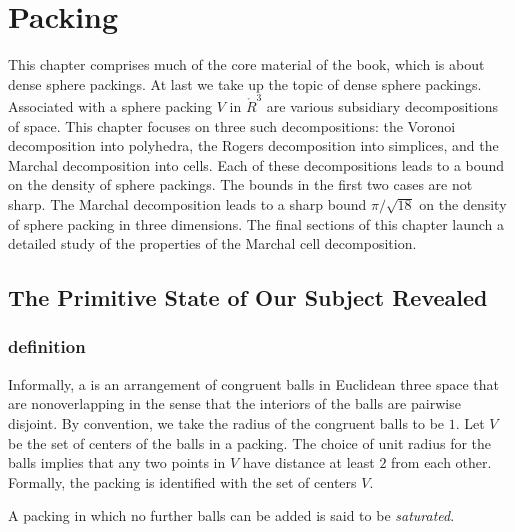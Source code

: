
\chapter{Packing}

\begin{summary}
This chapter comprises much of the core material of the book, which is
about dense sphere packings.  At last we take up the topic of dense sphere
packings.
 Associated with a sphere packing $V$ in $\ring{R}^3$
are various subsidiary decompositions of space.
This chapter focuses on three such decompositions: the Voronoi decomposition into
polyhedra,  the Rogers decomposition into simplices, and the Marchal decomposition
into cells.  Each of these decompositions leads to a bound on the density of sphere
packings.  The bounds in the first two cases are not sharp.  The Marchal decomposition
leads to a sharp bound $\pi/\sqrt{18}$ on the density of sphere packing in three
dimensions.  The final sections of this chapter launch a detailed study of the properties
of the Marchal cell decomposition.
\end{summary}

\section{The Primitive State of Our Subject Revealed}


\subsection{definition}



Informally, a  is an arrangement of congruent
balls in Euclidean three space that are nonoverlapping in the sense
that the interiors of the balls are pairwise disjoint.  By convention,
we take the radius of the congruent balls to be $1$.
Let $ V$ be the set of centers of the balls in a
packing. The choice of unit radius for the
balls implies that any two points in $ V$ have distance  at
least $2$ from each other. 
 Formally, the packing is identified
with the set of centers $V$.
%

%
A packing in which no further balls can be added is said to be {\it
saturated}.


